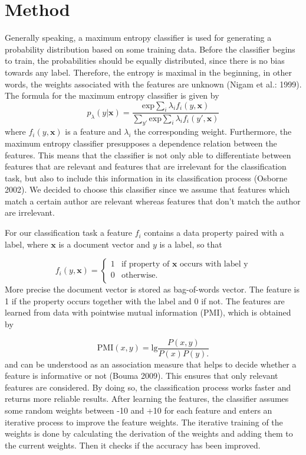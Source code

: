 \documentclass[11pt]{article}
\begin{document}
\section{Method}
Generally speaking, a maximum entropy classifier is used for generating a probability distribution based on some training data. Before the classifier begins to train, the probabilities should be equally distributed, since there is no bias towards any label. Therefore, the entropy is maximal in the beginning, in other words, the weights associated with the features are unknown (Nigam et al.: 1999). The formula for the maximum entropy classifier is given by 
\[p_{\lambda}(y|\pmb{x}) = \frac{\text{exp} \sum_i \lambda_i f_i(y,\pmb{x})}{\sum_{y'} \text{exp} \sum_i \lambda_i f_i (y',\pmb{x})}\]
where $f_i(y, \pmb{x})$ is a feature and $\lambda_i$ the corresponding weight.
Furthermore, the maximum entropy classifier presupposes a dependence relation between the features. This means that the classifier is not only able to differentiate between features that are relevant and features that are irrelevant for the classification task, but also to include this information in its classification process (Osborne 2002).
We decided to choose this classifier since we assume that features which match a certain author are relevant whereas features that don't match the author are irrelevant.

For our classification task a feature $f_{i}$ contains a data property paired with a label, where $\pmb{x}$ is a document vector and $y$ is a label, so that

\[f_{i}(y,\pmb{x})=\begin{cases}
1& \text{if property of }\pmb{x} \text{ occurs with label y}\\
0& \text{otherwise.} \\
\end{cases}\] 
More precise the document vector is stored as bag-of-words vector. The feature is 1 if the property occurs together with the label and 0 if not.
The features are learned from data with pointwise mutual information (PMI), which is obtained by

\[\text{PMI}(x,y)=\text{lg}\frac{P(x,y)}{P(x)P(y) .}\]
and can be understood as an association measure that helps to decide whether a feature is informative or not (Bouma 2009). This ensures that only relevant features are considered. By doing so, the classification process works faster and returns more reliable results.
After learning the features, the classifier assumes some random weights between -10 and +10 for each feature and enters an iterative process to improve the feature weights. The iterative training of the weights is done by calculating the derivation of the weights and adding them to the current weights. Then it checks if the accuracy has been improved. 
\end{document}
